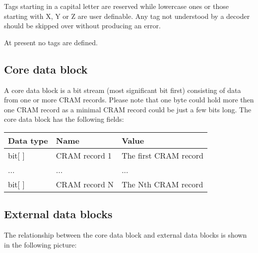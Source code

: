 \documentclass[a4paper]{article}
\begin{document}
Tags starting in a capital letter are reserved while lowercase ones or
those starting with X, Y or Z are user definable.  Any tag not
understood by a decoder should be skipped over without producing an
error.

At present no tags are defined.

%
% 


\subsection{\textbf{Core data block}}

A core data block is a bit stream (most significant bit first) consisting of data from one 
or more CRAM records. Please note that one byte could hold more then one CRAM record 
as a minimal CRAM record could be just a few bits long. The core data block has 
the following fields:

\begin{tabular}{|l|>{\raggedright}p{120pt}|>{\raggedright}p{260pt}|}
\hline
\textbf{Data type} & \textbf{Name} & \textbf{Value}
\tabularnewline
\hline
bit[ ] & CRAM record 1 & The first CRAM record\tabularnewline
\hline
... & ... & ...\tabularnewline
\hline
bit[ ] & CRAM record N & The Nth CRAM record \tabularnewline
\hline
\end{tabular}

\subsection{\textbf{External data blocks}}

The relationship between the core data block and external data blocks is shown in the following 
picture: 
\end{document}
